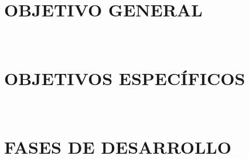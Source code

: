 \fontsize{14}{15}\selectfont

\section{OBJETIVO GENERAL}
\blindtext\\

\section{OBJETIVOS ESPECÍFICOS}
\blindtext\\

\section{FASES DE DESARROLLO}
\blindtext\\
